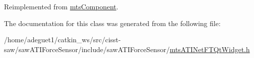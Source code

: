 Reimplemented from \hyperlink{classmts_component_aaf28f0262b44eb6866e10089a02fa6e4}{mts\-Component}.



The documentation for this class was generated from the following file\-:\begin{DoxyCompactItemize}
\item 
/home/adeguet1/catkin\-\_\-ws/src/cisst-\/saw/saw\-A\-T\-I\-Force\-Sensor/include/saw\-A\-T\-I\-Force\-Sensor/\hyperlink{mts_a_t_i_net_f_t_qt_widget_8h}{mts\-A\-T\-I\-Net\-F\-T\-Qt\-Widget.\-h}\end{DoxyCompactItemize}
